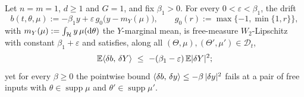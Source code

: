\begin{proposition}\label{prop:strict}
Let $n=m=1$, $d\ge1$ and $G=1$, and fix $\beta_1>0$. For every $0<\varepsilon<\beta_1$,
the drift
\begin{equation}\label{eq:bmean}
b(t,\theta,\mu):=-\beta_1 y+\varepsilon\,g_0\bigl(y-m_Y(\mu)\bigr),\qquad
g_0(r):=\max\{-1,\min\{1,r\}\},
\end{equation}
with $m_Y(\mu):=\int_{\mathcal H}y\,\mu(\mathrm{d}\theta)$ the $Y$-marginal mean, is
free-measure $W_2$-Lipschitz with constant $\beta_1+\varepsilon$ and satisfies, along
all $(\Theta,\mu),(\Theta',\mu')\in\mathcal D_t$,
\begin{equation}\label{eq:diagdrift}
\mathbb{E}\langle \delta b,\,\delta Y\rangle\ \le\ -(\beta_1-\varepsilon)\,\mathbb{E}|\delta Y|^2 ;
\end{equation}
yet for every $\beta\ge0$ the pointwise bound
$\langle \delta b,\,\delta y\rangle\le-\beta\,|\delta y|^2$ fails at a pair of free inputs with
$\theta\in\operatorname{supp}\mu$ and $\theta'\in\operatorname{supp}\mu'$.
\end{proposition}
